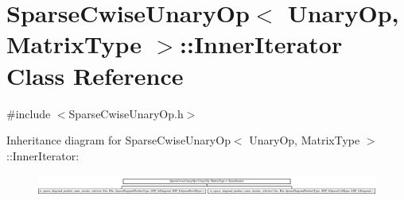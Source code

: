 \hypertarget{class_sparse_cwise_unary_op_1_1_inner_iterator}{\section{Sparse\-Cwise\-Unary\-Op$<$ Unary\-Op, Matrix\-Type $>$\-:\-:Inner\-Iterator Class Reference}
\label{class_sparse_cwise_unary_op_1_1_inner_iterator}
}


{\ttfamily \#include $<$Sparse\-Cwise\-Unary\-Op.\-h$>$}

Inheritance diagram for Sparse\-Cwise\-Unary\-Op$<$ Unary\-Op, Matrix\-Type $>$\-:\-:Inner\-Iterator\-:\begin{figure}[H]
\begin{center}
\leavevmode
\includegraphics[height=0.693928cm]{class_sparse_cwise_unary_op_1_1_inner_iterator}
\end{center}
\end{figure}
